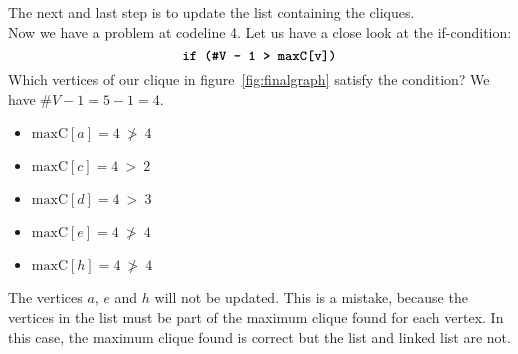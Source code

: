 \documentclass[12pt, xcolor=dvipsnames]{scrartcl}
\theoremstyle{definition}
\newcommand{\card}[1]{\# #1}
\newcommand{\maxc}{\mathrm{maxC}}
\theoremstyle{definition}
\begin{document}
          The next and last step is to update the list containing the cliques.\\
          Now we have a problem at codeline 4.
          Let us have a close look at the if-condition:
          \[ \textbf{\texttt{if (\#V - 1 > maxC[v])}} \]
          Which vertices of our clique in figure~\ref{fig:finalgraph}
          satisfy the condition? We have $\card V - 1 = 5 - 1 = 4$.

          \begin{itemize}
            \item[\textcolor{red}{\textbullet}] $\maxc[a] = 4 ~\ngtr~ 4$ 
            \item[\textcolor{Green}{\textbullet}] $\maxc[c] = 4 ~>~ 2$
            \item[\textcolor{Green}{\textbullet}] $\maxc[d] = 4 ~>~ 3$
            \item[\textcolor{red}{\textbullet}] $\maxc[e] = 4 ~\ngtr~ 4$
            \item[\textcolor{red}{\textbullet}] $\maxc[h] = 4 ~\ngtr~ 4$
          \end{itemize}

          The vertices $a$, $e$ and $h$ will not be updated.
          This is a mistake, because the vertices in the list must be part of
          the maximum clique found for each vertex.
          In this case, the maximum clique found is correct 
          but the list and linked list are not. 
\end{document}
